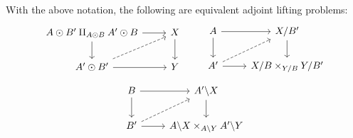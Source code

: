 \documentclass[main.tex]{subfiles}
\begin{document}
\begin{proposition}
  \label{prop:equivalent_lifting_problems}
  With the above notation, the following are equivalent adjoint lifting problems:
  \begin{equation*}
    \begin{tikzcd}
      A \odot B' \amalg_{A \odot B} A' \odot B
      \arrow[r]
      \arrow[d]
      & X
      \arrow[d]
      \\
      A' \odot B'
      \arrow[r]
      \arrow[ur, dashed]
      & Y
    \end{tikzcd}
    \qquad
    \begin{tikzcd}
      A
      \arrow[r]
      \arrow[d]
      & X / B'
      \arrow[d]
      \\
      A'
      \arrow[r]
      \arrow[ur, dashed]
      & X / B \times_{Y / B} Y / B'
    \end{tikzcd}
  \end{equation*}
  \begin{equation*}
    \begin{tikzcd}
      B
      \arrow[r]
      \arrow[d]
      & A' \backslash X
      \arrow[d]
      \\
      B'
      \arrow[r]
      \arrow[ur, dashed]
      & A \backslash X \times_{A \backslash Y} A' \backslash Y
    \end{tikzcd}
  \end{equation*}
\end{proposition}
\end{document}
